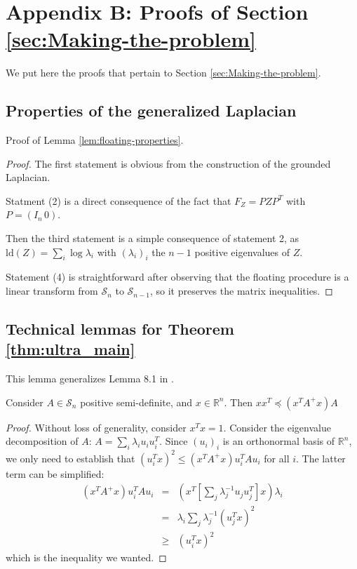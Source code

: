 
\section*{Appendix B: Proofs of Section \ref{sec:Making-the-problem}}

We put here the proofs that pertain to Section \ref{sec:Making-the-problem}. 


\subsection{Properties of the generalized Laplacian}

Proof of Lemma \ref{lem:floating-properties}.

\begin{proof}The first statement is obvious from the construction
of the grounded Laplacian.

Statment (2) is a direct consequence of the fact that $F_{Z}=PZP^{T}$
with $P=\left(I_{n}\,0\right)$.

Then the third statement is a simple consequence of statement 2, as
$\text{ld}\left(Z\right)=\sum_{i}\log\lambda_{i}$ with $\left(\lambda_{i}\right)_{i}$
the $n-1$ positive eigenvalues of $Z$.

Statement (4) is straightforward after observing that the floating
procedure is a linear transform from $\mathcal{S}_{n}$ to $\mathcal{S}_{n-1}$,
so it preserves the matrix inequalities.

\end{proof}


\subsection{Technical lemmas for Theorem \ref{thm:ultra_main}}

This lemma generalizes Lemma 8.1 in \cite{Spielman2009a}.

\begin{lemma}\label{lem:simple-inequality}Consider $A\in\mathcal{S}_{n}$
positive semi-definite, and $x\in\mathbb{R}^{n}$. Then $xx^{T}\preceq\left(x^{T}A^{+}x\right)A$

\end{lemma}

\begin{proof}Without loss of generality, consider $x^{T}x=1$. Consider
the eigenvalue decomposition of $A$: $A=\sum_{i}\lambda_{i}u_{i}u_{i}^{T}$.
Since $\left(u_{i}\right)_{i}$ is an orthonormal basis of $\mathbb{R}^{n}$,
we only need to establish that $\left(u_{i}^{T}x\right)^{2}\leq\left(x^{T}A^{+}x\right)u_{i}^{T}Au_{i}$
for all $i$. The latter term can be simplified:
\begin{eqnarray*}
\left(x^{T}A^{+}x\right)u_{i}^{T}Au_{i} & = & \left(x^{T}\left[\sum_{j}\lambda_{j}^{-1}u_{j}u_{j}^{T}\right]x\right)\lambda_{i}\\
 & = & \lambda_{i}\sum_{j}\lambda_{j}^{-1}\left(u_{j}^{T}x\right)^{2}\\
 & \geq & \left(u_{i}^{T}x\right)^{2}
\end{eqnarray*}
which is the inequality we wanted.

\end{proof}

